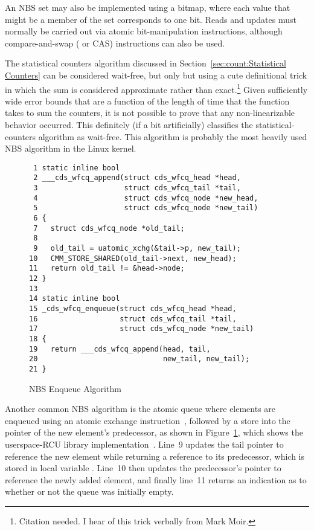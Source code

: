 An NBS set may also be implemented using a bitmap, where each value that
might be a member of the set corresponds to one bit.
Reads and updates must normally be carried out via atomic bit-manipulation
instructions, although compare-and-swap ( or CAS)
instructions can also be used.

The statistical counters algorithm discussed in
Section~\ref{sec:count:Statistical Counters}
can be considered wait-free, but only but using a cute definitional trick
in which the sum is considered approximate rather than exact.\footnote{
	Citation needed.
	I hear of this trick verbally from Mark Moir.}
Given sufficiently wide error bounds that are a function of the length
of time that the  function takes to sum the counters,
it is not possible to prove that any non-linearizable behavior occurred.
This definitely (if a bit artificially) classifies the statistical-counters
algorithm as wait-free.
This algorithm is probably the most heavily used NBS algorithm in
the Linux kernel.

\begin{figure}[tbp]
{ \scriptsize
\begin{verbatim}
 1 static inline bool
 2 ___cds_wfcq_append(struct cds_wfcq_head *head,
 3                    struct cds_wfcq_tail *tail,
 4                    struct cds_wfcq_node *new_head,
 5                    struct cds_wfcq_node *new_tail)
 6 {
 7   struct cds_wfcq_node *old_tail;
 8 
 9   old_tail = uatomic_xchg(&tail->p, new_tail);
10   CMM_STORE_SHARED(old_tail->next, new_head);
11   return old_tail != &head->node;
12 }
13 
14 static inline bool
15 _cds_wfcq_enqueue(struct cds_wfcq_head *head,
16                   struct cds_wfcq_tail *tail,
17                   struct cds_wfcq_node *new_tail)
18 {
19   return ___cds_wfcq_append(head, tail,
20                             new_tail, new_tail);
21 }
\end{verbatim}
}
\caption{NBS Enqueue Algorithm}
\label{fig:count:NBS Enqueue Algorithm}
\end{figure}

Another common NBS algorithm is the atomic queue where elements are
enqueued using an atomic exchange instruction~\cite{MagedMichael1993JPDC},
followed by a store into the  pointer of the new element's
predecessor, as shown in
Figure~\ref{fig:count:NBS Enqueue Algorithm},
which shows the userspace-RCU library
implementation~\cite{MathieuDesnoyers2009URCU}.
Line~9 updates the tail pointer to reference the new element while
returning a reference to its predecessor, which is stored in
local variable .
Line~10 then updates the predecessor's  pointer to
reference the newly added element, and finally line~11
returns an indication as to whether or not the queue was initially
empty.

